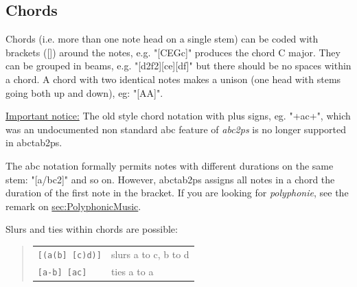 \documentclass[a4paper]{article}
\begin{document}
\subsection{Chords}
 
Chords (i.e. more than one note head on a  single  stem)  can  be
coded  with brackets ([]) around the notes, e.g. "[CEGc]" produces the
chord  C  major.  They  can  be  grouped   in   beams,   e.g.
"[d2f2][ce][df]" but there should be no spaces within a chord.
A chord with two identical notes makes a unison (one head
with stems going both up and down), eg: "[AA]".
\par
\underline{Important notice:} The old style chord notation with
plus signs, eg. "+ac+", which was an undocumented non standard abc 
feature of {\it abc2ps} is no longer supported in abctab2ps.
\par
The abc notation formally permits notes with different durations 
on the same stem: "[a/bc2]" and so on. However, abctab2ps assigns all
notes in a chord the duration of the first note in the bracket.
If you are looking for {\it polyphonie}, see the remark on 
\hyperref{abcm2ps}{abcm2ps in section }{}{sec:PolyphonicMusic}.
\par
Slurs and ties within chords are possible:
\begin{quote}
\begin{tabular}{ll}
 \verb$[(a(b] [c)d)]$ & slurs a to c, b to d \\
 \verb$[a-b] [ac]$    & ties a to a \\
\end{tabular}
\end{quote}

\end{document}
